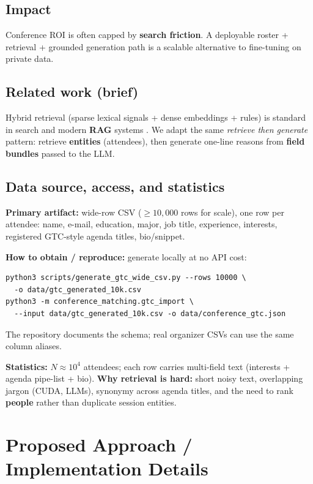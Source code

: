 \documentclass[paper=a4, fontsize=11pt]{scrartcl}
\begin{document}
\subsection*{Impact}

Conference ROI is often capped by \textbf{search friction}. A deployable roster + retrieval + grounded generation path is a scalable alternative to fine-tuning on private data.

\subsection*{Related work (brief)}

Hybrid retrieval (sparse lexical signals + dense embeddings + rules) is standard in search and modern \textbf{RAG} systems \cite{lewis2020retrieval}. We adapt the same \emph{retrieve then generate} pattern: retrieve \textbf{entities} (attendees), then generate one-line reasons from \textbf{field bundles} passed to the LLM.

\subsection*{Data source, access, and statistics}

\textbf{Primary artifact:} wide-row CSV (\(\geq 10{,}000\) rows for scale), one row per attendee: name, e-mail, education, major, job title, experience, interests, registered GTC-style agenda titles, bio/snippet.

\textbf{How to obtain / reproduce:} generate locally at no API cost:
\begin{verbatim}
python3 scripts/generate_gtc_wide_csv.py --rows 10000 \
  -o data/gtc_generated_10k.csv
python3 -m conference_matching.gtc_import \
  --input data/gtc_generated_10k.csv -o data/conference_gtc.json
\end{verbatim}
\noindent The repository documents the schema; real organizer CSVs can use the same column aliases.

\textbf{Statistics:} \(N \approx 10^4\) attendees; each row carries multi-field text (interests + agenda pipe-list + bio). \textbf{Why retrieval is hard:} short noisy text, overlapping jargon (CUDA, LLMs), synonymy across agenda titles, and the need to rank \textbf{people} rather than duplicate session entities.

\section{Proposed Approach / Implementation Details}
\end{document}
